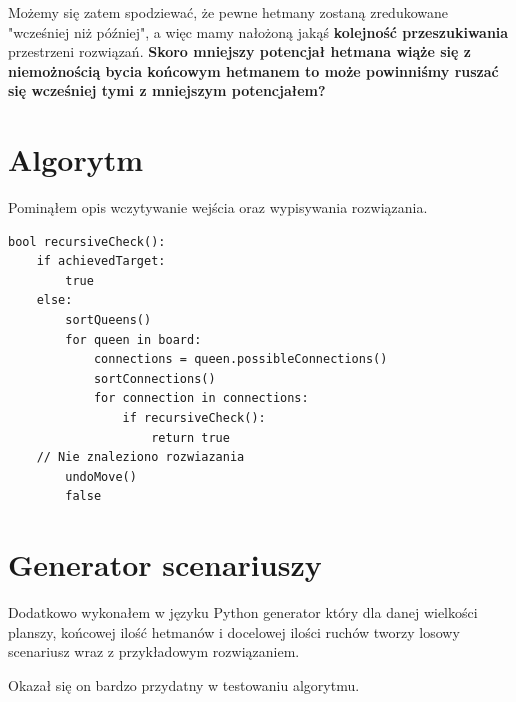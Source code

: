 \documentclass{article}
\begin{document}
Możemy się zatem spodziewać, że pewne hetmany zostaną zredukowane "wcześniej niż później", a więc mamy nałożoną jakąś \textbf{kolejność przeszukiwania} przestrzeni rozwiązań. \textbf{Skoro mniejszy potencjał hetmana wiąże się z niemożnością bycia końcowym hetmanem to może powinniśmy ruszać się  wcześniej tymi z mniejszym potencjałem?}

\section{Algorytm}

Pominąłem opis wczytywanie wejścia oraz wypisywania rozwiązania.

\begin{lstlisting}
bool recursiveCheck():
	if achievedTarget:
		true
	else:
		sortQueens()
		for queen in board:
			connections = queen.possibleConnections()
			sortConnections()
			for connection in connections:
				if recursiveCheck():
					return true
	// Nie znaleziono rozwiazania	
		undoMove()	
		false
\end{lstlisting}

\section{Generator scenariuszy}

Dodatkowo wykonałem w języku Python generator który dla danej wielkości planszy, końcowej ilość hetmanów i docelowej ilości ruchów tworzy losowy scenariusz wraz z przykładowym rozwiązaniem.

Okazał się on bardzo przydatny w testowaniu algorytmu.
\end{document}
